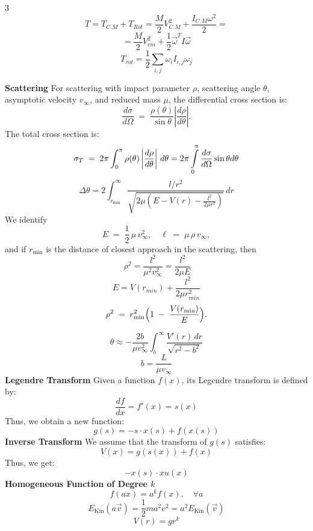 \documentclass[1pt]{article}
\begin{document}
\begin{multicols}{3}
\[T=T_{C.M}+T_{Rot}=\frac{M}{2}V_{C.M}^2+\frac{I_{C.M}\omega^2}{2}=\]
\[=\frac{M}{2}V_{cm}^{2}+\frac{1}{2}\vec{\omega}^{T}I\vec{\omega}\]
\[T_{rot}=\frac{1}{2}\sum_{i,j}\omega_{i}I_{i,j}\omega_{j}\]

\textbf{Scattering }
For scattering with impact parameter $\rho$, scattering angle $\theta$, asymptotic velocity $v_\infty$, and reduced mass $\mu$, the differential cross section is:
\begin{equation*}
    \frac{d\sigma}{d\Omega}
    \;=\;
    \frac{\rho(\theta)}{\sin \theta}
    \left|\frac{d\rho}{d\theta}\right|.
\end{equation*}
The total cross section is:
\begin{equation*}
    \sigma_{T}
    \;=\;
    2\pi \int_{0}^{\pi}
    \rho(\theta)
    \left|\frac{d\rho}{d\theta}\right|
    \,d\theta=2\pi\intop_{0}^{\pi}\frac{d\sigma}{d\Omega}\sin\theta d\theta
\end{equation*}
\[\Delta \theta = 2 \int_{r_{\min}}^{\infty} \frac{l / r^2}{\sqrt{2\mu \left( E - V(r) - \frac{l^2}{2\mu r^2} \right)}} \, dr
\]
We identify
\[
E \;=\;\frac12\,\mu\,v_{\infty}^{2},
\quad
\ell \;=\;\mu\,\rho\,v_{\infty},
\]
and if $r_{\min}$ is the distance of closest approach in the scattering, then
\[\ \rho^2=\frac{l^2}{\mu^2v_{\infty}^{2}}=\frac{l^2}{2\mu E}\]
\[E=V\left(r_{min}\right)+\frac{l^{2}}{2\mu r_{min}^{2}}\]
\[
\rho^{2}
\;=\;
r_{\min}^{2}\Bigl(1 \;-\;\frac{V(r_{\min})}{E}\Bigr).
\]

\begin{equation*}
    \theta \approx - \frac{2b}{\mu v_\infty^2} \int_b^\infty \frac{V'(r) \, dr}{\sqrt{r^2 - b^2}}
\end{equation*}
\begin{equation*}
    b = \frac{L}{\mu v_\infty}
\end{equation*}
\textbf{Legendre Transform}
Given a function \( f(x) \), its Legendre transform is defined by:
\begin{equation*}
    \frac{df}{dx} = f'(x) = s(x)
\end{equation*}
Thus, we obtain a new function:
\begin{equation*}
    g(s) = -s\cdot x(s) + f(x(s))
\end{equation*}
\textbf{Inverse Transform}
We assume that the transform of \( g(s) \) satisfies:
\begin{equation*}
    V(x) = g(s(x)) + f(x)
\end{equation*}
Thus, we get:
\begin{equation*}
    -x(s) \cdot xu(x)
\end{equation*}
\textbf{Homogeneous Function of Degree \( k \)}
\begin{equation*}
    f(a x) = a^k f(x), \quad \forall a
\end{equation*}
\begin{equation*}
    E_\text{Kin}(a\vec{v})=\frac{1}{ 2}ma^2v^2=a^2E_\text{Kin}(\vec{v})
\end{equation*}
\begin{equation*}
    V(r)=g r^k 
\end{equation*}


\end{multicols}
\end{document}
